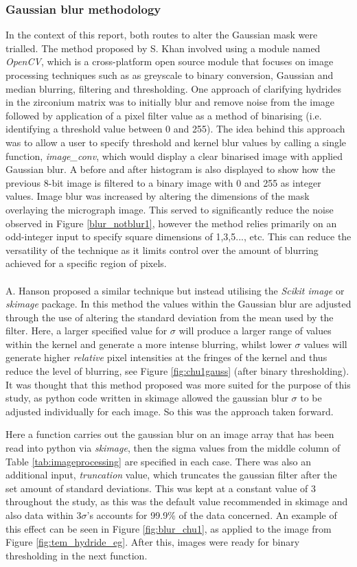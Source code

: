 \documentclass{article}
\begin{document}
	\subsubsection{Gaussian blur methodology}
	In the context of this report, both routes to alter the Gaussian mask were trialled. The method proposed by S. Khan involved using a module named \textit{OpenCV}, which is a cross-platform open source module that focuses on image processing techniques such as as greyscale to binary conversion, Gaussian and median blurring, filtering and thresholding. One approach of clarifying hydrides in the zirconium matrix was to initially blur and remove noise from the image followed by application of a pixel filter value as a method of binarising (i.e. identifying a threshold value between 0 and 255). The idea behind this approach was to allow a user to specify threshold and kernel blur values by calling a single function, \textit{image\_conv}, which would display a clear binarised image with applied Gaussian blur. A before and after histogram is also displayed to show how the previous 8-bit image is filtered to a binary image with 0 and 255 as integer values. Image blur was increased by altering the dimensions of the mask overlaying the micrograph image. This served to significantly reduce the noise observed in Figure \ref{blur_notblur1}, however the method relies primarily on an odd-integer input to specify square dimensions of 1,3,5..., etc. This can reduce the versatility of the technique as it limits control over the amount of blurring achieved for a specific region of pixels. 
	\\
	\\
	A. Hanson proposed a similar technique but instead utilising the \textit{Scikit image} or \textit{skimage} package. In this method the values within the Gaussian blur are adjusted through the use of altering the standard deviation from the mean used by the filter. Here, a larger specified value for $\sigma$ will produce a larger range of values within the kernel and generate a more intense blurring, whilst lower $\sigma$ values will generate higher \textit{relative} pixel intensities at the fringes of the kernel and thus reduce the level of blurring, see Figure \ref{fig:chu1gauss} (after binary thresholding). It was thought that this method proposed was more suited for the purpose of this study, as python code written in skimage allowed the gaussian blur $\sigma$ to be adjusted individually for each image. So this was the approach taken forward.
	
	Here a function carries out the gaussian blur on an image array that has been read into python via \textit{skimage}, then the sigma values from the middle column of Table \ref{tab:imageprocessing} are specified in each case. There was also an additional input, \textit{truncation} value, which truncates the gaussian filter after the set amount of standard deviations. This was kept at a constant value of 3 throughout the study, as this was the default value recommended in skimage and also data within $3\sigma$'s accounts for 99.9\% of the data concerned. An example of this effect can be seen in Figure \ref{fig:blur_chu1}, as applied to the image from Figure \ref{fig:tem_hydride_eg}. After this, images were ready for binary thresholding in the next function.
	
\end{document}
